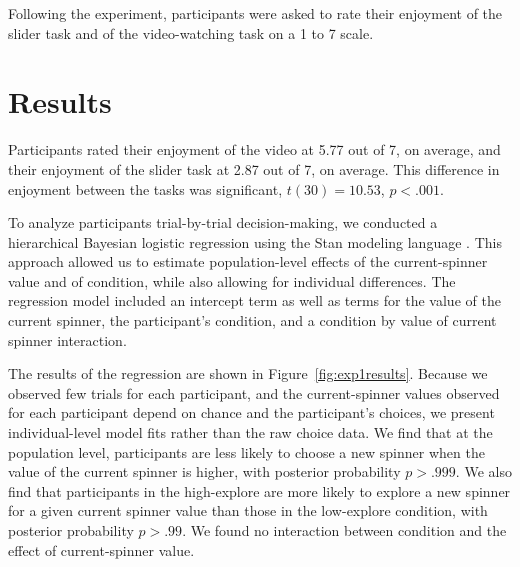 \documentclass[10pt,letterpaper]{article}
\begin{document}
Following the experiment, participants were asked to rate their enjoyment of the
slider task and of the video-watching task on a 1 to 7 scale.


\section{Results}


Participants rated their enjoyment of the video at 5.77 out of 7, on average,
and their enjoyment of the slider task at 2.87 out of 7, on average. This
difference in enjoyment between the tasks was significant, $t(30)=10.53$, $p<.001$.

To analyze participants trial-by-trial decision-making, we conducted a hierarchical
Bayesian logistic regression using the Stan modeling language \citep{stan-software:2015}.
This approach allowed us to estimate population-level effects of the
current-spinner value and of condition, while also allowing for individual
differences. The regression model included an intercept term as well as terms
for the value of the current spinner, the participant's condition, and a
condition by value of current spinner interaction.

The results of the regression are shown in Figure~\ref{fig:exp1results}.
Because we observed few trials for each participant, and the current-spinner
values observed for each participant depend on chance and the participant's
choices, we present individual-level model fits rather than the raw choice data.
We find that at the population level, participants are less likely to choose a
new spinner when the value of the current spinner is higher, with posterior
probability $p>.999$. We also find that participants in the high-explore are more likely to explore a new spinner for a
given current spinner value than those in the low-explore condition, with
posterior probability $p>.99$. We found no interaction between condition and the
effect of current-spinner value.
\end{document}
